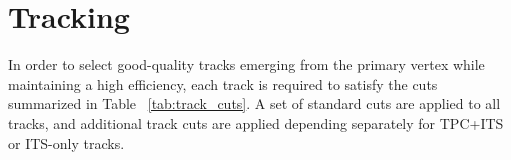 



\section{Tracking}
In order to select good-quality tracks emerging from the primary vertex while maintaining a high efficiency, each track is required to satisfy the cuts summarized in Table ~\ref{tab:track_cuts}. A set of standard cuts are applied to all tracks, and additional track cuts are applied depending separately for TPC+ITS or ITS-only tracks. 

